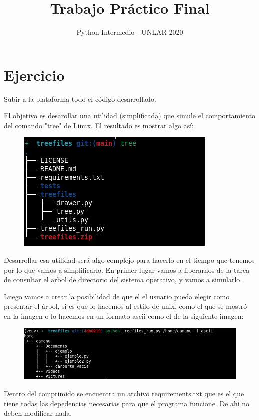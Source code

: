 \documentclass[12pt, spanish]{article}
\title{Trabajo Práctico Final}
\author{Python Intermedio - UNLAR 2020}
\begin{document}
\maketitle

\section{Ejercicio}

Subir a la plataforma todo el código desarrollado.

El objetivo es desarollar una utilidad (simplificada) que simule el comportamiento
del comando "tree" de Linux. El resultado es mostrar algo así:

\begin{figure}[h]
	\centering
	\includegraphics[width=0.7\linewidth]{"1"}
	\label{fig:---3}
\end{figure}

Desarrollar esa utilidad será algo complejo para hacerlo en el tiempo que tenemos
por lo que vamos a simplificarlo. En primer lugar vamos a liberarnos de la tarea
de consultar el arbol de directorio del sistema operativo, y vamos a simularlo.

Luego vamos a crear la posibilidad de que el el usuario pueda elegir como presentar
el árbol, si es que lo hacemos al estilo de unix, como el que se mostró en la imagen
o lo hacemos en un formato ascii como el de la siguiente imagen:

\begin{figure}
	\centering
	\includegraphics[width=0.7\linewidth]{2}
	\label{fig:2}
\end{figure}


Dentro del comprimido se encuentra  un archivo requirements.txt que es el que tiene
todas las depedencias necesarias para que el programa funcione. De ahi no deben modificar nada.
\end{document}
